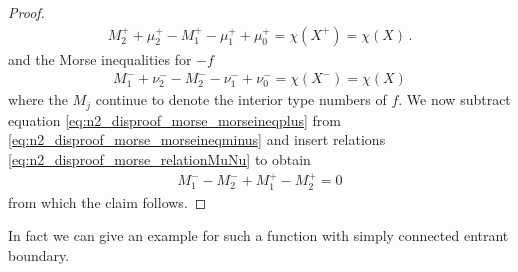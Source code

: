 \begin{proof}
  \begin{align}
    M_2^++\mu^+_2-M_1^+-\mu^+_1+\mu^+_0=\chi(X^+)=\chi(X)\,.\label{eq:n2_disproof_morse_morseineqplus}
  \end{align}
  and the Morse inequalities for $-f$
  \begin{align}
    M_1^-+\nu^-_2-M_2^--\nu^-_1+\nu^-_0=\chi(X^-)=\chi(X)\label{eq:n2_disproof_morse_morseineqminus}
  \end{align}
  where the $M_j$ continue to denote the interior type numbers of $f$.
  We now subtract equation \eqref{eq:n2_disproof_morse_morseineqplus} from \eqref{eq:n2_disproof_morse_morseineqminus}
  and insert relations \eqref{eq:n2_disproof_morse_relationMuNu} to obtain
  \begin{align*}
    M_1^--M_2^-+M_1^+-M_2^+=0
  \end{align*}
  from which the claim follows.
\end{proof}
In fact we can give an example for such a function with
simply connected entrant boundary.
